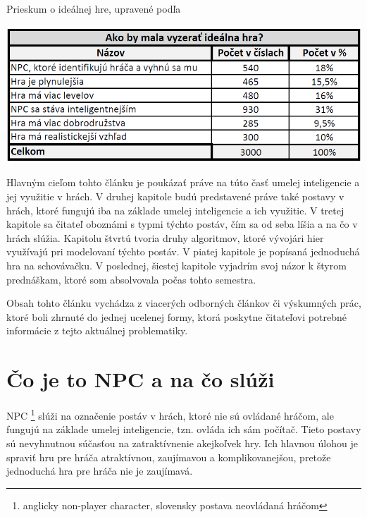 \documentclass[10pt,twoside,slovak,a4paper]{article}
\begin{document}
\begin{table}[tbh]
\caption{Prieskum o ideálnej hre, upravené podľa \cite{Types}}
\center \includegraphics[scale=0.5]{prieskum.png}
\label{t:t1}
\end{table}

Hlavným cieľom tohto článku je poukázať práve na túto časť umelej inteligencie a jej využitie v hrách. V druhej kapitole budú predstavené práve také postavy v hrách, ktoré fungujú iba na základe umelej inteligencie a ich využitie. V tretej kapitole sa čitateľ oboznámi s typmi týchto postáv, čím sa od seba líšia a na čo v hrách slúžia. Kapitolu štvrtú tvoria druhy algoritmov, ktoré vývojári hier využívajú pri modelovaní týchto postáv. V piatej kapitole je popísaná jednoduchá hra na schovávačku. V poslednej, šiestej kapitole vyjadrím svoj názor k štyrom prednáškam, ktoré som absolvovala počas tohto semestra. 

Obsah tohto článku vychádza z viacerých odborných článkov či výskumných prác, ktoré boli zhrnuté do jednej ucelenej formy, ktorá poskytne čitateľovi potrebné informácie z tejto aktuálnej problematiky. 


\section{Čo je to NPC a na čo slúži}  \label{nejaka}
\quad NPC \footnote{anglicky non-player character, slovensky postava neovládaná hráčom} slúži na označenie postáv v hrách, ktoré nie sú ovládané hráčom, ale fungujú na základe umelej inteligencie, tzn. ovláda ich sám počítač. Tieto postavy sú nevyhnutnou súčasťou na zatraktívnenie akejkoľvek hry. Ich hlavnou úlohou je spraviť hru pre hráča atraktívnou, zaujímavou a komplikovanejšou, pretože jednoduchá hra pre hráča nie je zaujímavá. 
\end{document}
